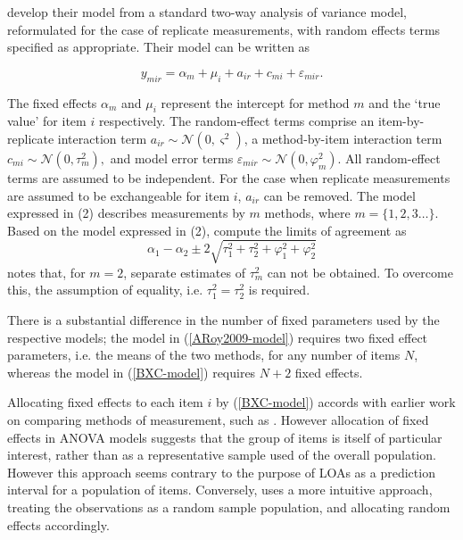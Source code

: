 \documentclass[12pt, a4paper]{report}
\theoremstyle{plain}
\theoremstyle{definition}
\theoremstyle{remark}
\begin{document}
	
	\citet{BXC2008} develop their model from a standard two-way analysis of variance model, reformulated for the case of replicate measurements, with random effects terms specified as appropriate.
	Their model can be written as
	
	\begin{equation}\label{BXC-model}
	y_{mir}  = \alpha_{m} + \mu_{i} + a_{ir} + c_{mi} + \varepsilon_{mir}.
	\end{equation}
	
	The fixed effects $\alpha_{m}$ and $\mu_{i}$ represent the intercept for method $m$ and the `true value' for item $i$ respectively. The random-effect terms comprise an item-by-replicate interaction term $a_{ir} \sim \mathcal{N}(0,\varsigma^{2})$, a method-by-item interaction term $c_{mi} \sim \mathcal{N}(0,\tau^{2}_{m}),$ and model error terms $\varepsilon_{mir} \sim \mathcal{N}(0,\varphi^{2}_{m}).$ All random-effect terms are assumed to be independent. For the case when replicate measurements are assumed to be exchangeable for item $i$, $a_{ir}$ can be removed. The model expressed in (2) describes measurements by $m$ methods, where $m = \{1,2,3\ldots\}$. Based on the model expressed in (2), \citet{BXC2008} compute the limits of agreement as
	\[
	\alpha_1 - \alpha_2 \pm 2 \sqrt{ \tau^2_1 +  \tau^2_2 +  \varphi^2_1 +  \varphi^2_2 }
	\]
	\citet{BXC2008} notes that, for $m=2$,  separate estimates of $\tau^2_m$ can not be obtained. To overcome this, the assumption of equality, i.e. $\tau^2_1 = \tau^2_2$ is required.
	
	There is a substantial difference in the number of fixed parameters used by the respective models; the model in (\ref{ARoy2009-model}) requires two fixed effect parameters, i.e. the means of the two methods, for any number of items $N$, whereas the model in (\ref{BXC-model}) requires $N+2$ fixed effects.
	
	Allocating fixed effects to each item $i$ by (\ref{BXC-model}) accords with earlier work on comparing methods of measurement, such as \citet{Grubbs48}. However allocation of fixed effects in ANOVA models suggests that the group of items is itself of particular interest, rather than as a representative sample used of the overall population. However this approach seems contrary to the purpose of LOAs as a prediction interval for a population of items. Conversely, \citet{ARoy2009}
	uses a more intuitive approach, treating the observations as a random sample population, and allocating random effects accordingly.
	
\end{document}
